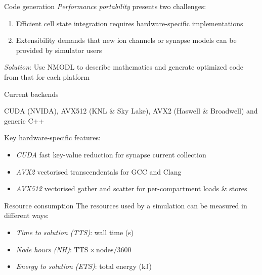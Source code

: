 \documentclass[a0paper,portrait]{baposter}
\newcommand{\newemph}[1]{{\color{blue}\em #1}}
\begin{document}
\begin{poster}
\begin{posterbox}[name=targets,column=0,below=network,span=1]{Code generation}
    \vspace{4pt}
    \newemph{Performance portability} presents two challenges:
    \begin{enumerate}
        \item Efficient cell state integration requires hardware-specific implementations
        \item Extensibility demands that new ion channels or synapse models can be provided by simulator users
    \end{enumerate}


    \vspace{5pt}
    \newemph{Solution}: Use NMODL to describe mathematics and generate optimized code from that for each platform
    \\%

    \vspace{-16pt}
    \begin{center}
      \colorbox{yellow!20}{Current backends}
    \end{center}
    \vspace{-4pt}
    CUDA (NVIDA), AVX512 (KNL \& Sky Lake), AVX2 (Haswell \& Broadwell) and generic C++

    \vspace{4pt}
    Key hardware-specific features:
    \begin{itemize}
        \item \newemph{CUDA} fast key-value reduction for synapse current collection
        \item \newemph{AVX2} vectorised transcendentals for GCC and Clang
        \item \newemph{AVX512} vectorised gather and scatter for per-compartment loads \& stores
    \end{itemize}

    \vspace{17pt}
\end{posterbox}

\begin{posterbox}[name=resources,column=1,below=network,span=1]{Resource consumption}
    \vspace{4pt}
    The resources used by a simulation can be measured in different ways:
    \begin{itemize}
        \item \newemph{Time to solution (TTS)}: wall time (s)
        \item \newemph{Node hours (NH)}: $\text{TTS}\times\text{nodes}/3600$
        \item \newemph{Energy to solution (ETS)}: total energy (kJ)
    \end{itemize}


\end{posterbox}
\end{poster}
\end{document}
